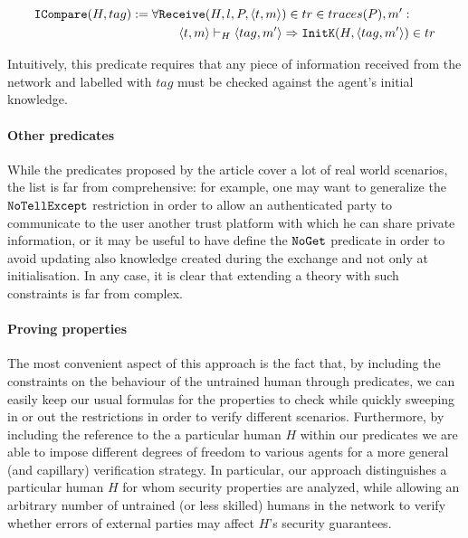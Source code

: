 \documentclass{article}
\newcommand{\mono}[1]{\textrm{\tt #1}}
\begin{document}
\begin{align*}
    \mono{ICompare}(H,tag) := \forall \mono{Rec}&\mono{eive}(H,l,P,\langle t,m \rangle) \in tr \in traces(P), m' : \\
    &\langle t,m \rangle \vdash_H \langle tag,m' \rangle \Rightarrow \mono{InitK}(H, \langle tag,m' \rangle) \in tr
\end{align*}

Intuitively, this predicate requires that any piece of information received from the network and labelled with $tag$ must be checked against the agent's initial knowledge.

\paragraph{Other predicates}

While the predicates proposed by the article cover a lot of real world scenarios, the list is far from comprehensive: for example, one may want to generalize the $\mono{NoTellExcept}$ restriction in order to allow an authenticated party to communicate to the user another trust platform with which he can share private information, or it may be useful to have define the $\mono{NoGet}$ predicate in order to avoid updating also knowledge created during the exchange and not only at initialisation. In any case, it is clear that extending a theory with such constraints is far from complex.

\paragraph{Proving properties}

The most convenient aspect of this approach is the fact that, by including the constraints on the behaviour of the untrained human through predicates, we can easily keep our usual formulas for the properties to check while quickly sweeping in or out the restrictions in order to verify different scenarios. Furthermore, by including the reference to the a particular human $H$ within our predicates we are able to impose different degrees of freedom to various agents for a more general (and capillary) verification strategy. In particular, our approach distinguishes a particular human $H$ for whom security properties are analyzed, while allowing an arbitrary number of untrained (or less skilled) humans in the network to verify whether errors of external parties may affect $H$'s security guarantees.



\end{document}
